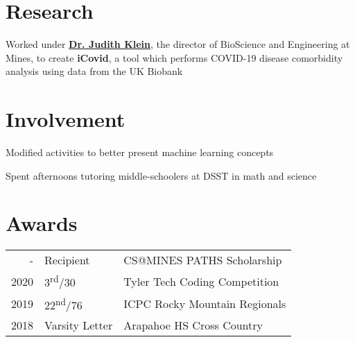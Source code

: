 \documentclass[]{darling-resume-openfont}
\begin{document}
\begin{minipage}[t]{0.66\textwidth}

\section{Research}
Worked under \textbf{\href{https://chemistry.mines.edu/project/klein-seetharaman-judith/}{Dr. Judith Klein}}, the director of BioScience and Engineering at Mines, to create \textbf{iCovid}, a tool which performs COVID-19 disease comorbidity analysis using data from the UK Biobank
\sectionsep


\section{Involvement}

\begin{tightemize}
\item Modified activities to better present machine learning concepts
\end{tightemize}
\sectionsep

\begin{tightemize}
\item Spent afternoons tutoring middle-schoolers at DSST in math and science
\end{tightemize}
\sectionsep


\section{Awards}
\begin{tabular}{rll}
- & Recipient & CS@MINES PATHS Scholarship \\
2020 & 3\textsuperscript{rd}/30 & Tyler Tech Coding Competition \\
2019 & 22\textsuperscript{nd}/76 & ICPC Rocky Mountain Regionals \\
2018 & Varsity Letter & Arapahoe HS Cross Country \\
\end{tabular}
\sectionsep


\end{minipage} 
\end{document}
